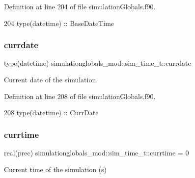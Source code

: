 Definition at line 204 of file simulation\+Globals.\+f90.


\begin{DoxyCode}
204         \textcolor{keywordtype}{type}(datetime)  :: BaseDateTime
\end{DoxyCode}
\mbox{\label{structsimulationglobals__mod_1_1sim__time__t_a547910a1c56076286ad768d6862725a5}} 
\subsubsection{\texorpdfstring{currdate}{currdate}}
{\footnotesize\ttfamily type(datetime) simulationglobals\+\_\+mod\+::sim\+\_\+time\+\_\+t\+::currdate\hspace{0.3cm}{\ttfamily [private]}}



Current date of the simulation. 



Definition at line 208 of file simulation\+Globals.\+f90.


\begin{DoxyCode}
208         \textcolor{keywordtype}{type}(datetime)  :: CurrDate
\end{DoxyCode}
\mbox{\label{structsimulationglobals__mod_1_1sim__time__t_aef4f2cbfeae48936accb80bcc819b778}} 
\subsubsection{\texorpdfstring{currtime}{currtime}}
{\footnotesize\ttfamily real(prec) simulationglobals\+\_\+mod\+::sim\+\_\+time\+\_\+t\+::currtime = 0\hspace{0.3cm}{\ttfamily [private]}}



Current time of the simulation (s) 



